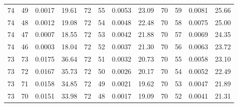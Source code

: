 \begin{tabular}{llll|llll|llll}
74 & 49 & 0.0017 & 19.61 & 72 & 55 & 0.0053 & 23.09 & 70 & 59 & 0.0081 & 25.66\\
74 & 48 & 0.0012 & 19.08 & 72 & 54 & 0.0048 & 22.48 & 70 & 58 & 0.0075 & 25.00\\
74 & 47 & 0.0007 & 18.55 & 72 & 53 & 0.0042 & 21.88 & 70 & 57 & 0.0069 & 24.35\\
74 & 46 & 0.0003 & 18.04 & 72 & 52 & 0.0037 & 21.30 & 70 & 56 & 0.0063 & 23.72\\
73 & 73 & 0.0175 & 36.64 & 72 & 51 & 0.0032 & 20.73 & 70 & 55 & 0.0058 & 23.10\\
73 & 72 & 0.0167 & 35.73 & 72 & 50 & 0.0026 & 20.17 & 70 & 54 & 0.0052 & 22.49\\
73 & 71 & 0.0158 & 34.85 & 72 & 49 & 0.0021 & 19.62 & 70 & 53 & 0.0047 & 21.89\\
73 & 70 & 0.0151 & 33.98 & 72 & 48 & 0.0017 & 19.09 & 70 & 52 & 0.0041 & 21.31\\
\bottomrule
\end{tabular}
\newpage
